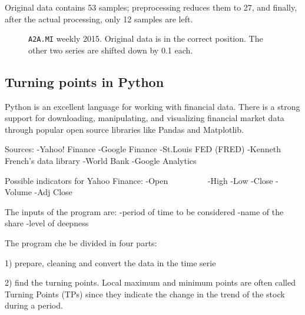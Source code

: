 \documentclass[a4paper]{article}
\begin{document}
Original data contains 53 samples; preprocessing reduces them to 27, and finally, after the actual processing, only 12 samples are left. 

\clearpage %

\begin{figure}%
	
	
	\caption{\texttt{A2A.MI} weekly 2015. Original data is in the correct position. The other two series are shifted down by 0.1 each.}\label{fig:a2a_w_2015}

\end{figure}


\subsection{Turning points in Python}\label{sec:tp_python}

Python is an excellent language for working with financial data.
There is a strong support for downloading, manipulating, and visualizing financial market data through popular open source libraries like Pandas and Matplotlib.

Sources:
-Yahoo! Finance
-Google Finance
-St.Louis FED (FRED)
-Kenneth French’s data library
-World Bank
-Google Analytics    

Possible indicators for Yahoo Finance:
-Open         
-High
-Low
-Close
-Volume
-Adj Close

The inputs of the program are: 
-period of time to be considered
-name of the share
-level of deepness

The program che be divided in four parts:

1) prepare, cleaning and convert the data in the time serie

2) find the turning points.
Local maximum and minimum points are often called Turning Points (TPs) since they indicate the change in the trend of the stock during a period. 
\end{document}
